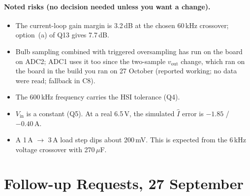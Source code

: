 \documentclass[11pt]{article}
\begin{document}
\paragraph{Noted risks (no decision needed unless you want a change).}
\begin{itemize}[nosep]
\item The current-loop gain margin is 3.2\,dB at the chosen 60\,kHz
      crossover; option~(a) of Q13 gives 7.7\,dB.
\item Bulb sampling combined with triggered oversampling has run on
      the board on ADC2; ADC1 uses it too since the two-sample
      $v_{\mathrm{out}}$ change, which ran on the board in the build you
      ran on 27 October (reported working; no data were read; fallback
      in C8).
\item The 600\,kHz frequency carries the HSI tolerance (Q4).
\item $V_{\mathrm{in}}$ is a constant (Q5). At a real 6.5\,V, the
      simulated $\hat{I}$ error is $-1.85$ / $-0.40\,\mathrm{A}$.
\item A 1\,A $\to$ 3\,A load step dips about 200\,mV. This is expected
      from the 6\,kHz voltage crossover with 270\,$\mu$F.
\end{itemize}

\section{Follow-up Requests, 27 September}
\label{sec:followup}
\end{document}
